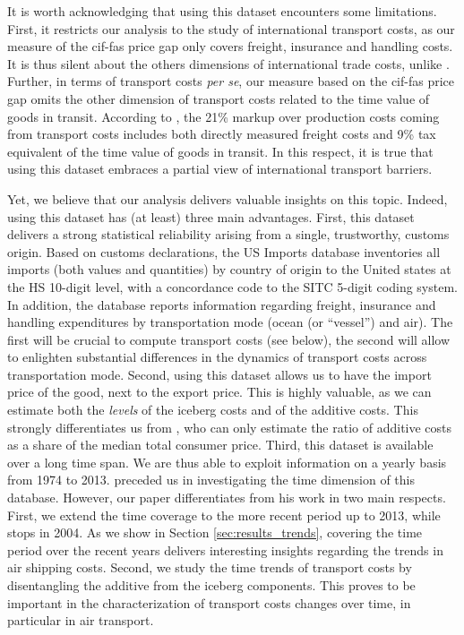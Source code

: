 \documentclass[a4paper,11pt]{article}
\begin{document}
It is worth acknowledging that using this dataset encounters some limitations. First, it restricts our analysis to the study of international transport costs, as our measure of the cif-fas price gap only covers freight, insurance and handling costs. It is thus silent about the others dimensions of international trade costs, unlike \citet{Irrazabal_2015}. Further, in terms of transport costs \textit{per se}, our measure based on the cif-fas price gap omits the other dimension of transport costs related to the time value of goods in transit. According to \citet{anderson_wincoop_jel}, the 21\% markup over production costs coming from transport costs includes both directly measured freight costs and 9\% tax equivalent of the time value of goods in transit. In this respect, it is true that using this dataset embraces a partial view of international transport barriers.

Yet, we believe that our analysis delivers valuable insights on this topic. Indeed, using this dataset has (at least) three main advantages. First, this dataset delivers a strong statistical reliability arising from a single, trustworthy, customs origin. Based on customs declarations, the US Imports database inventories all imports (both values and quantities) by country of origin to the United states at the HS 10-digit level, with a concordance code to the SITC 5-digit coding system. In addition, the database reports information regarding freight, insurance and handling expenditures by transportation mode (ocean (or ``vessel'') and air). The first will be crucial to compute transport costs (see below), the second will allow to enlighten substantial differences in the dynamics of transport costs across transportation mode. Second, using this dataset allows us to have the import price of the good, next to the export price. This is highly valuable, as we can estimate both the \textit{levels} of the iceberg costs and of the additive costs. This strongly differentiates us from \citet{Irrazabal_2015}, who can only estimate the ratio of additive costs as a share of the median total consumer price. Third, this dataset is available over a long time span. We are thus able to exploit information on a yearly basis from 1974 to 2013. \cite{hummels2007} preceded us in investigating the time dimension of this database. However, our paper differentiates from his work in two main respects. First, we extend the time coverage to the more recent period up to 2013, while \cite{hummels2007} stops in 2004. As we show in Section \ref{sec:results_trends}, covering the time period over the recent years delivers interesting insights regarding the trends in air shipping costs. Second, we study the time trends of transport costs by disentangling the additive from the iceberg components. This proves to be important in the characterization of transport costs changes over time, in particular in air transport.\smallskip
\end{document}
